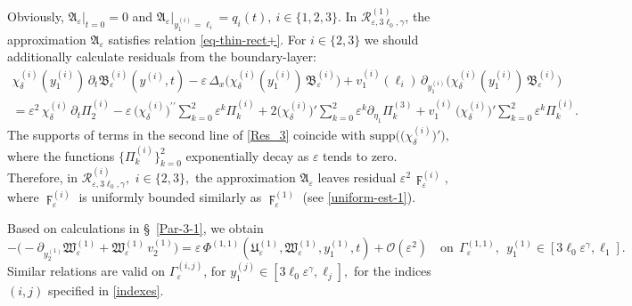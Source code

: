 \documentclass[reqno]{amsart}            %
\numberwithin{equation}{section}
\begin{document}
	Obviously,
	$\mathfrak{A}_\varepsilon\big|_{t=0} = 0$ and $\mathfrak{A}_\varepsilon\big|_{y^{(i)}_1=\ell_i} = q_i(t), \ i\in \{1,2,3\}.$
	In $\mathcal{R}^{(1)}_{\varepsilon,3\ell_0,\gamma}$,  the approximation
	$\mathfrak{A}_\varepsilon$ satisfies relation \eqref{eq-thin-rect+}. For $ i\in\{2, 3\} $ we should additionally calculate  residuals from the boundary-layer:
	\begin{multline}\label{Res_3}
		\chi_\delta^{(i)}(y^{(i)}_1) \, \partial_t\mathfrak{B}^{(i)}_\varepsilon(y^{(i)}, t) -  \varepsilon\, \Delta_x \big(\chi_\delta^{(i)}(y^{(i)}_1) \, \mathfrak{B}^{(i)}_\varepsilon\big) +
		v_1^{(i)}(\ell_i) \, \partial_{y^{(i)}_1} \big(\chi_\delta^{(i)}(y^{(i)}_1) \, \mathfrak{B}^{(i)}_\varepsilon\big)
		\\
		= \varepsilon^2\, \chi_\delta^{(i)} \, \partial_t \Pi_2^{(i)}
		- \varepsilon \,  \big(\chi_\delta^{(i)}\big)^{\prime\prime}  \sum\limits_{k=0}^{2} \varepsilon^{k} \Pi_k^{(i)}
		+ 2  \big(\chi_\delta^{(i)}\big)'  \sum\limits_{k=0}^{2} \varepsilon^{k} \partial_{\eta_1} \Pi_k^{(3)}
		+  v_1^{(i)}  \,  \big(\chi_\delta^{(i)}\big)'  \sum\limits_{k=0}^{2} \varepsilon^{k} \Pi_k^{(i)}.
	\end{multline}
	The supports of terms  in the second line of \eqref{Res_3} coincide with $\mathrm{supp}\big(\big(\chi_\delta^{(i)}\big)'\big),$ where
	the functions $\{\Pi_k^{(i)}\}_{k=0}^{2}$ exponentially decay as $\varepsilon$ tends to zero. Therefore, in
	$\mathcal{R}^{(i)}_{\varepsilon,3\ell_0,\gamma},$ $i\in\{2,3\},$ the approximation
	$\mathfrak{A}_\varepsilon$ leaves residual $\varepsilon^2 \, \digamma^{(i)}_\varepsilon,$ where $\digamma^{(i)}_\varepsilon$ is uniformly bounded similarly as $\digamma^{(1)}_\varepsilon$ (see \eqref{uniform-est-1}).
	
	Based on calculations in \S~\ref{Par-3-1}, we obtain 
	$$
	-\Big(-\partial_{y^{(1)}_2}\mathfrak{W}^{(1)}_\varepsilon
	+ \mathfrak{W}^{(1)}_\varepsilon \,v^{(1)}_2\Big) = 
	\varepsilon\,\Phi^{(1,1)}\!\left(\mathfrak{U}^{(1)}_\varepsilon,
	\mathfrak{W}^{(1)}_\varepsilon,y^{(1)}_1,t\right)
	+ \mathcal{O}(\varepsilon^2) \quad \text{on} \ \ \Gamma_\varepsilon^{(1,1)}, \ \ y^{(1)}_1\in[3\ell_0\varepsilon^\gamma,\ell_1].
	$$
	Similar relations are valid on $\Gamma_\varepsilon^{(i,j)}$, for $y^{(j)}_1\in[3\ell_0\varepsilon^\gamma,\ell_j],$ for the indices $(i,j)$ specified in \eqref{indexes}.		
	
\end{document}
